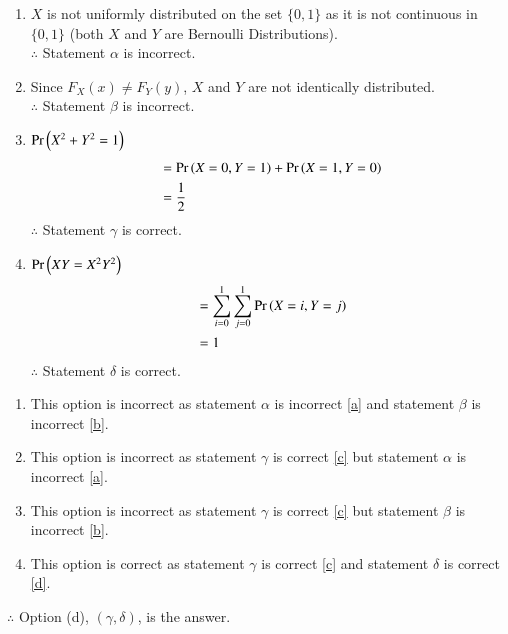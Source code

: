 \documentclass[journal,12pt,twocolumn]{IEEEtran}
\begin{document}
\begin{enumerate}[label=(\arabic*)]
    \item $X$ is not uniformly distributed on the set $\{0,1\}$ as it is not continuous in $\{0,1\}$ (both $X$ and $Y$ are Bernoulli Distributions).\\
    $\therefore$ Statement $\alpha$ is incorrect.\label{a}\\ 
    \item Since $F_X(x)\neq F_Y(y)$, $X$ and $Y$ are not identically distributed.\\
    $\therefore$ Statement $\beta$ is incorrect.\label{b}\\
    \item $\Pr\left(X^2+Y^2=1\right)$\label{c}
    \begin{align}
        &=\Pr\left(X=0,Y=1\right)+\Pr\left(X=1,Y=0\right)\nonumber\\
        &= \frac{1}{2}
    \end{align}
    $\therefore$ Statement $\gamma$ is correct.\\
    \item $\Pr\left(XY=X^2Y^2\right)$\label{d}
    \begin{align}
        &=\sum_{i=0}^1\sum_{j=0}^1\Pr\left(X=i,Y=j\right)\nonumber\\
        &= 1
    \end{align}
    $\therefore$ Statement $\delta$ is correct.\\
\end{enumerate}

\begin{enumerate}[label=(\alph*)]
    \item This option is incorrect as statement $\alpha$ is incorrect \ref{a} and statement $\beta$ is incorrect \ref{b}.\\
    \item This option is incorrect as statement $\gamma$ is correct \ref{c} but statement $\alpha$ is incorrect \ref{a}.\\
    \item This option is incorrect as statement $\gamma$ is correct \ref{c} but statement $\beta$ is incorrect \ref{b}.\\
    \item This option is correct as statement $\gamma$ is correct \ref{c} and statement $\delta$ is correct \ref{d}.\\
\end{enumerate}

$\therefore$ Option (d), $(\gamma,\delta)$, is the answer.
\end{document}
